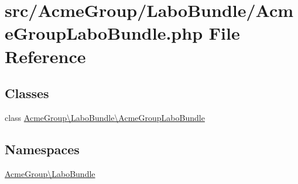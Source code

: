 \hypertarget{_acme_group_labo_bundle_8php}{\section{src/\+Acme\+Group/\+Labo\+Bundle/\+Acme\+Group\+Labo\+Bundle.php File Reference}
\label{_acme_group_labo_bundle_8php}
}
\subsection*{Classes}
\begin{DoxyCompactItemize}
\item 
class \hyperlink{class_acme_group_1_1_labo_bundle_1_1_acme_group_labo_bundle}{Acme\+Group\textbackslash{}\+Labo\+Bundle\textbackslash{}\+Acme\+Group\+Labo\+Bundle}
\end{DoxyCompactItemize}
\subsection*{Namespaces}
\begin{DoxyCompactItemize}
\item 
 \hyperlink{namespace_acme_group_1_1_labo_bundle}{Acme\+Group\textbackslash{}\+Labo\+Bundle}
\end{DoxyCompactItemize}
